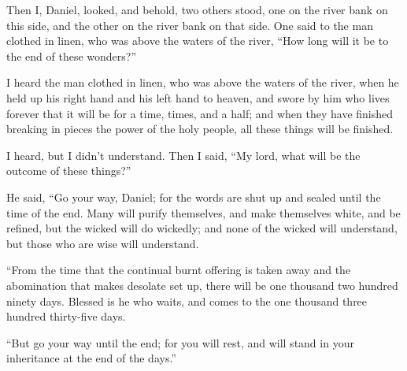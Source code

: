 Then I, Daniel, looked, and behold, two others stood, one
on the river bank on this side, and the other on the river bank on that
side.  One said to the man clothed in linen, who was above
the waters of the river, ``How long will it be to the end of these
wonders?''

 I heard the man clothed in linen, who was above the waters
of the river, when he held up his right hand and his left hand to
heaven, and swore by him who lives forever that it will be for a time,
times, and a half; and when they have finished breaking in pieces the
power of the holy people, all these things will be finished.

 I heard, but I didn't understand. Then I said, ``My lord,
what will be the outcome of these things?''

 He said, ``Go your way, Daniel; for the words are shut up
and sealed until the time of the end.  Many will purify
themselves, and make themselves white, and be refined, but the wicked
will do wickedly; and none of the wicked will understand, but those who
are wise will understand.

 ``From the time that the continual burnt offering is taken
away and the abomination that makes desolate set up, there will be one
thousand two hundred ninety days.  Blessed is he who waits,
and comes to the one thousand three hundred thirty-five days.

 ``But go your way until the end; for you will rest, and
will stand in your inheritance at the end of the days.''
